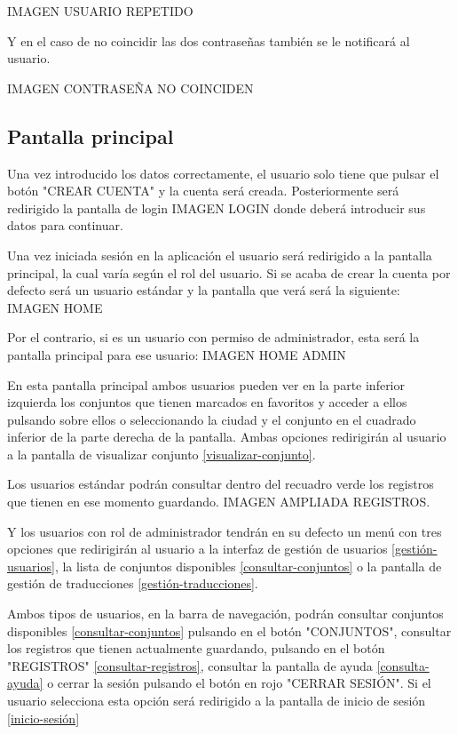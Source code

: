 IMAGEN USUARIO REPETIDO

Y en el caso de no coincidir las dos contraseñas también se le notificará al usuario.

IMAGEN CONTRASEÑA NO COINCIDEN


\subsection{Pantalla principal}\label{home}

Una vez introducido los datos correctamente, el usuario solo tiene que pulsar el botón "CREAR CUENTA" y la cuenta será creada. Posteriormente será redirigido la pantalla de login IMAGEN LOGIN donde deberá introducir sus datos para continuar.

Una vez iniciada sesión en la aplicación el usuario será redirigido a la pantalla principal, la cual varía según el rol del usuario. Si se acaba de crear la cuenta por defecto será un usuario estándar y la pantalla que verá será la siguiente:
IMAGEN HOME

Por el contrario, si es un usuario con permiso de administrador, esta será la pantalla principal para ese usuario:
IMAGEN HOME ADMIN

En esta pantalla principal ambos usuarios pueden ver en la parte inferior izquierda los conjuntos que tienen marcados en favoritos y acceder a ellos pulsando sobre ellos o seleccionando la ciudad y el conjunto en el cuadrado inferior de la parte derecha de la pantalla. Ambas opciones redirigirán al usuario a la pantalla de visualizar conjunto \ref{visualizar-conjunto}.

Los usuarios estándar podrán consultar dentro del recuadro verde los registros que tienen en ese momento guardando.
IMAGEN AMPLIADA REGISTROS.

Y los usuarios con rol de administrador tendrán en su defecto un menú con tres opciones que redirigirán al usuario a la interfaz de gestión de usuarios \ref{gestión-usuarios}, la lista de conjuntos disponibles \ref{consultar-conjuntos} o la pantalla de gestión de traducciones \ref{gestión-traducciones}.


Ambos tipos de usuarios, en la barra de navegación, podrán consultar conjuntos disponibles \ref{consultar-conjuntos} pulsando en el botón "CONJUNTOS", consultar los registros que tienen actualmente guardando, pulsando en el botón "REGISTROS" \ref{consultar-registros}, consultar la pantalla de ayuda \ref{consulta-ayuda} o cerrar la sesión pulsando el botón en rojo "CERRAR SESIÓN". Si el usuario selecciona esta opción será redirigido a la pantalla de inicio de sesión \ref{inicio-sesión}

